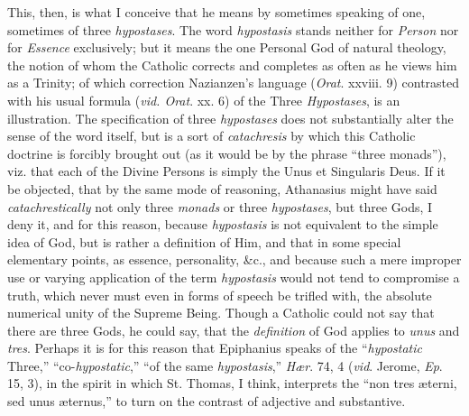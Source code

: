 This, then, is what I conceive that he means by sometimes speaking
of one, sometimes of three \emph{hypostases}. The word \emph{hypostasis}
stands neither for \emph{Person} nor for \emph{Essence} exclusively;
but it means the one Personal God of natural theology, the notion of
whom the Catholic corrects and completes as often as he views
him as a Trinity; of which correction Nazianzen's language (\emph{Orat}.
xxviii. 9) contrasted with his usual formula (\emph{vid. Orat}. xx. 6)
of the Three \emph{Hypostases}, is an illustration. The specification
of three \emph{hypostases} does not substantially alter the sense of
the word itself, but is a sort of \emph{catachresis} by which this
Catholic doctrine is forcibly brought out (as it would be by the
phrase ``three monads''), viz. that each of the Divine
Persons is simply the Unus et Singularis Deus. If it be objected, that
by the same mode of reasoning, Athanasius might have said \emph{catachrestically}
not only three \emph{monads} or three \emph{hypostases}, but three
Gods, I deny it, and for this reason, because \emph{hypostasis} is not
equivalent to the simple idea of God, but is rather a definition of
Him, and that in some special elementary points, as essence,
personality, \&c., and because such a mere improper use or varying
application of the term \emph{hypostasis} would not tend to compromise
a truth, which never must even in forms of speech be trifled with, the
absolute numerical unity of the Supreme Being. Though a Catholic could
not say that there are three Gods, he could say, that the \emph{definition}
of God applies to \emph{unus} and \emph{tres}. Perhaps it is for this
reason that Epiphanius speaks of the ``\emph{hypostatic}
Three,'' ``co-\emph{hypostatic},'' ``of the same \emph{hypostasis},''
\emph{Hær}. 74, 4 (\emph{vid}. Jerome, \emph{Ep}. 15, 3), in the
spirit in which St. Thomas, I think, interprets the ``non tres
æterni, sed unus æternus,'' to turn on the contrast of adjective
and substantive.

